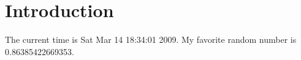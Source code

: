 \documentclass[11pt]{article}
\begin{document}
\section{Introduction}

The current time is Sat Mar 14 18:34:01 2009. My favorite random
number is 0.86385422669353.
\end{document}
